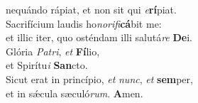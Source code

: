 \oddverse nequándo rápiat, et non sit qui \textit{e}\textbf{rí}piat.\\
\evenverse Sacrifícium laudis ho\textit{no}\textit{ri}\textit{fi}\textbf{cá}bit me:~\*\\
\evenverse et illic iter, quo osténdam illi salutá\textit{re} \textbf{De}i.\\
\oddverse Glória \textit{Pa}\textit{tri}, \textit{et} \textbf{Fí}lio,~\*\\
\oddverse et Spirítu\textit{i} \textbf{San}cto.\\
\evenverse Sicut erat in princípio, \textit{et} \textit{nunc}, \textit{et} \textbf{sem}per,~\*\\
\evenverse et in sǽcula sæculó\textit{rum}. \textbf{A}men.\\

